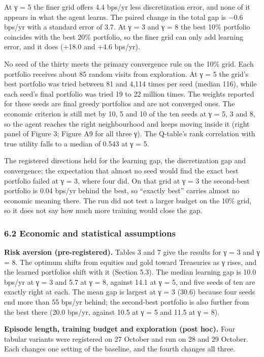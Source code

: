 \documentclass[
  11pt]{article}
\begin{document}
At γ = 5 the finer grid offers 4.4 bps/yr less discretization error, and
none of it appears in what the agent learns. The paired change in the
total gap is −0.6 bps/yr with a standard error of 3.7. At γ = 3 and γ =
8 the best 10\% portfolio coincides with the best 20\% portfolio, so the
finer grid can only add learning error, and it does (+18.0 and +4.6
bps/yr).

No seed of the thirty meets the primary convergence rule on the 10\%
grid. Each portfolio receives about 85 random visits from exploration.
At γ = 5 the grid's best portfolio was tried between 81 and 4,114 times
per seed (median 116), while each seed's final portfolio was tried 19 to
22 million times. The weights reported for these seeds are final greedy
portfolios and are not converged ones. The economic criterion is still
met by 10, 5 and 10 of the ten seeds at γ = 5, 3 and 8, so the agent
reaches the right neighbourhood and keeps moving inside it (right panel
of Figure 3; Figure A9 for all three γ). The Q-table's rank correlation
with true utility falls to a median of 0.543 at γ = 5.

The registered directions held for the learning gap, the discretization
gap and convergence; the expectation that almost no seed would find the
exact best portfolio failed at γ = 3, where four did. On that grid at γ
= 3 the second-best portfolio is 0.04 bps/yr behind the best, so
``exactly best'' carries almost no economic meaning there. The run did
not test a larger budget on the 10\% grid, so it does not say how much
more training would close the gap.

\subsubsection{6.2 Economic and statistical
assumptions}\label{economic-and-statistical-assumptions}

\textbf{Risk aversion (pre-registered).} Tables 3 and 7 give the results
for γ = 3 and γ = 8. The optimum shifts from equities and gold toward
Treasuries as γ rises, and the learned portfolios shift with it (Section
5.3). The median learning gap is 10.0 bps/yr at γ = 3 and 5.7 at γ = 8,
against 14.1 at γ = 5, and five seeds of ten are exactly right at each.
The mean gap is largest at γ = 3 (30.6) because four seeds end more than
55 bps/yr behind; the second-best portfolio is also further from the
best there (20.0 bps/yr, against 10.5 at γ = 5 and 11.5 at γ = 8).

\textbf{Episode length, training budget and exploration (post hoc).}
Four tabular variants were registered on 27 October and run on 28 and 29
October. Each changes one setting of the baseline, and the fourth
changes all three.
\end{document}
